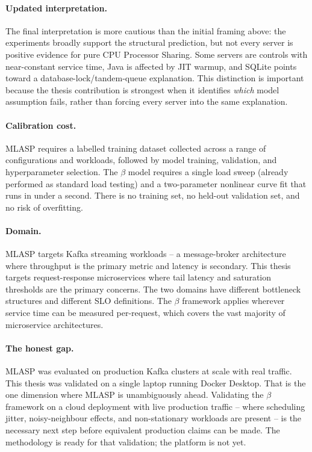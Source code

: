 \paragraph{Updated interpretation.}
The final interpretation is more cautious than the initial framing above: the experiments broadly support the structural prediction, but not every server is positive evidence for pure CPU Processor Sharing. Some servers are controls with near-constant service time, Java is affected by JIT warmup, and SQLite points toward a database-lock/tandem-queue explanation. This distinction is important because the thesis contribution is strongest when it identifies \emph{which} model assumption fails, rather than forcing every server into the same explanation.

\paragraph{Calibration cost.}
MLASP requires a labelled training dataset collected across a range of configurations and workloads, followed by model training, validation, and hyperparameter selection. The $\beta$ model requires a single load sweep (already performed as standard load testing) and a two-parameter nonlinear curve fit that runs in under a second. There is no training set, no held-out validation set, and no risk of overfitting.

\paragraph{Domain.}
MLASP targets Kafka streaming workloads -- a message-broker architecture where throughput is the primary metric and latency is secondary. This thesis targets request-response microservices where tail latency and saturation thresholds are the primary concerns. The two domains have different bottleneck structures and different SLO definitions. The $\beta$ framework applies wherever service time can be measured per-request, which covers the vast majority of microservice architectures.

\paragraph{The honest gap.}
MLASP was evaluated on production Kafka clusters at scale with real traffic. This thesis was validated on a single laptop running Docker Desktop. That is the one dimension where MLASP is unambiguously ahead. Validating the $\beta$ framework on a cloud deployment with live production traffic -- where scheduling jitter, noisy-neighbour effects, and non-stationary workloads are present -- is the necessary next step before equivalent production claims can be made. The methodology is ready for that validation; the platform is not yet.

